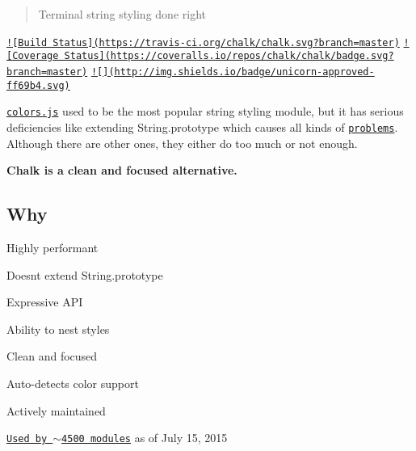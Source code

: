 \section*{~\newline
 ~\newline
  ~\newline
 ~\newline
 ~\newline
 }

\begin{quote}
Terminal string styling done right \end{quote}


\href{https://travis-ci.org/chalk/chalk}{\tt !\mbox{[}Build Status\mbox{]}(https\+://travis-\/ci.\+org/chalk/chalk.\+svg?branch=master)} \href{https://coveralls.io/r/chalk/chalk?branch=master}{\tt !\mbox{[}Coverage Status\mbox{]}(https\+://coveralls.\+io/repos/chalk/chalk/badge.\+svg?branch=master)} \href{https://www.youtube.com/watch?v=9auOCbH5Ns4}{\tt !\mbox{[}\mbox{]}(http\+://img.\+shields.\+io/badge/unicorn-\/approved-\/ff69b4.\+svg)}

\href{https://github.com/Marak/colors.js}{\tt colors.\+js} used to be the most popular string styling module, but it has serious deficiencies like extending {\ttfamily String.\+prototype} which causes all kinds of \href{https://github.com/yeoman/yo/issues/68}{\tt problems}. Although there are other ones, they either do too much or not enough.

{\bfseries Chalk is a clean and focused alternative.}



\subsection*{Why}


\begin{DoxyItemize}
\item Highly performant
\item Doesn\textquotesingle{}t extend {\ttfamily String.\+prototype}
\item Expressive A\+P\+I
\item Ability to nest styles
\item Clean and focused
\item Auto-\/detects color support
\item Actively maintained
\item \href{https://www.npmjs.com/browse/depended/chalk}{\tt Used by $\sim$4500 modules} as of July 15, 2015
\end{DoxyItemize}

